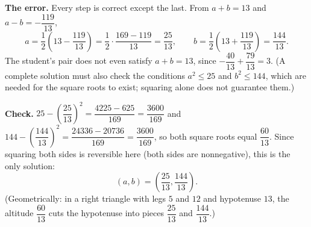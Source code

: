 \textbf{The error.} Every step is correct except the last. From $a+b=13$ and $a-b=-\dfrac{119}{13}$,
\[
a=\dfrac{1}{2}\left(13-\dfrac{119}{13}\right)=\dfrac{1}{2}\cdot\dfrac{169-119}{13}=\dfrac{25}{13},\qquad b=\dfrac{1}{2}\left(13+\dfrac{119}{13}\right)=\dfrac{144}{13}.
\]
The student's pair does not even satisfy $a+b=13$, since $-\dfrac{40}{13}+\dfrac{79}{13}=3$. (A complete solution must also check the conditions $a^2\le25$ and $b^2\le144$, which are needed for the square roots to exist; squaring alone does not guarantee them.)

\textbf{Check.} $25-\left(\dfrac{25}{13}\right)^2=\dfrac{4225-625}{169}=\dfrac{3600}{169}$ and $144-\left(\dfrac{144}{13}\right)^2=\dfrac{24336-20736}{169}=\dfrac{3600}{169}$, so both square roots equal $\dfrac{60}{13}$. Since squaring both sides is reversible here (both sides are nonnegative), this is the only solution:
\[
\boxed{(a,b)=\left(\dfrac{25}{13},\dfrac{144}{13}\right)}.
\]
(Geometrically: in a right triangle with legs $5$ and $12$ and hypotenuse $13$, the altitude $\dfrac{60}{13}$ cuts the hypotenuse into pieces $\dfrac{25}{13}$ and $\dfrac{144}{13}$.)
